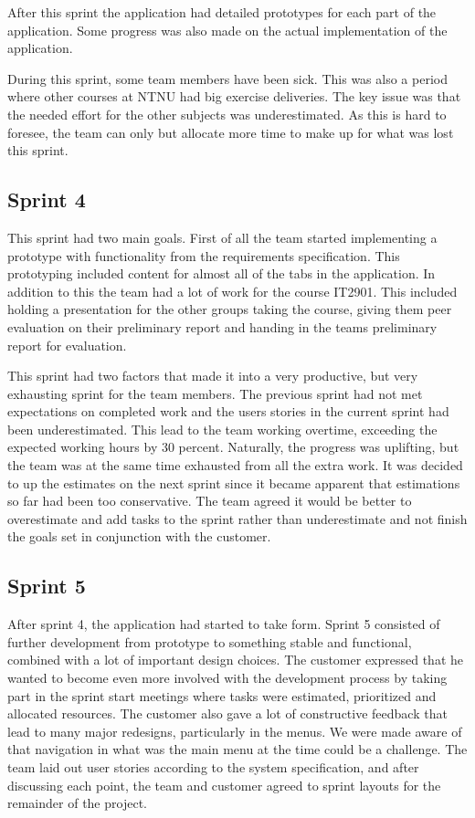 After this sprint the application had detailed prototypes for each part of the application.  Some progress was also made on the actual implementation of the application.

During this sprint, some team  members have been sick. This was also a period where other courses at NTNU had big exercise deliveries. The key issue was that the needed effort for the other subjects was underestimated. As this is hard to foresee, the team can only but allocate more time to make up for what was lost this sprint.

\subsection{Sprint 4}
This sprint had two main goals. First of all the team started implementing a prototype with functionality from the requirements specification. This prototyping included content for almost all of the tabs in the application. In addition to this the team had a lot of work for the course IT2901. This included holding a presentation for the other groups taking the course, giving them peer evaluation on their preliminary report and handing in the teams preliminary report for evaluation.

This sprint had two factors that made it into a very productive, but very exhausting sprint for the team members. The previous sprint had not met expectations on completed work and the users stories in the current sprint had been underestimated. This lead to the team working overtime, exceeding the expected working hours by 30 percent. Naturally, the progress was uplifting, but the team was at the same time exhausted from all the extra work. It was decided to up the estimates on the next sprint since it became apparent that estimations so far had been too conservative. The team agreed it would be better to overestimate and add tasks to the sprint rather than underestimate and not finish the goals set in conjunction with the customer.

\subsection{Sprint 5}
After sprint 4, the application had started to take form. Sprint 5 consisted of further development from prototype to something stable and functional, combined with a lot of important design choices. The customer expressed that he wanted to become even more involved with the development process by taking part in the sprint start meetings where tasks were estimated, prioritized and allocated resources. The customer also gave a lot of constructive feedback that lead to many major redesigns, particularly in the menus. We were made aware of that navigation in what was the main menu at the time could be a challenge. The team laid out user stories according to the system specification, and after discussing each point, the team and customer agreed to sprint layouts for the remainder of the project.

